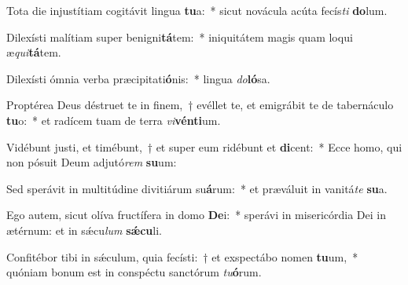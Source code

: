 \item Tota die injustítiam cogitávit lingua \textbf{tu}a:~* sicut novácula acúta fecís\textit{ti} \textbf{do}lum.
\item Dilexísti malítiam super benigni\textbf{tá}tem:~* iniquitátem magis quam loqui æ\textit{qui}\textbf{tá}tem.
\item Dilexísti ómnia verba præcipitati\textbf{ó}nis:~* lingua \textit{do}\textbf{ló}sa.
\item Proptérea Deus déstruet te in finem,~† evéllet te, et emigrábit te de tabernáculo \textbf{tu}o:~* et radícem tuam de terra \textit{vi}\textbf{vén}\textbf{ti}um.
\item Vidébunt justi, et timébunt,~† et super eum ridébunt et \textbf{di}cent:~* Ecce homo, qui non pósuit Deum adjutó\textit{rem} \textbf{su}um:
\item Sed sperávit in multitúdine divitiárum su\textbf{á}rum:~* et præváluit in vanitá\textit{te} \textbf{su}a.
\item Ego autem, sicut olíva fructífera in domo \textbf{De}i:~* sperávi in misericórdia Dei in ætérnum: et in sǽcu\textit{lum} \textbf{sǽ}\textbf{cu}li.
\item Confitébor tibi in sǽculum, quia fecísti:~† et exspectábo nomen \textbf{tu}um,~* quóniam bonum est in conspéctu sanctórum \textit{tu}\textbf{ó}rum.
